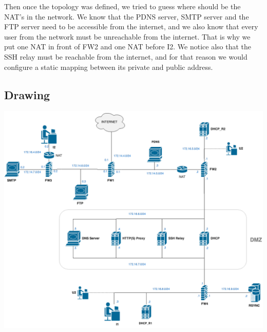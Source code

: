 \documentclass[a4paper,titlepage]{article}
\begin{document}
Then once the topology was defined, we tried to guess where should be the NAT's in the network. We know that the  PDNS server, SMTP server and the FTP server need to be accessible from the internet, and we also know that every user from the network must be unreachable from the internet. That is why we put one NAT in front of FW2 and one NAT before I2. We notice also that the SSH relay must be reachable from the internet, and for that reason we would configure a static mapping between its private and public address.


\subsection{Drawing}
\begin{center}
	\includegraphics[scale=0.4]{ICS-Draw.png}
\end{center}
	
\end{document}
